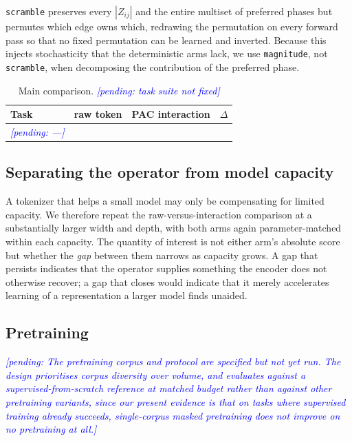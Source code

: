 \documentclass{article}
\newcommand{\pending}[1]{\textcolor{blue}{\textit{[pending: #1]}}}
\begin{document}
\texttt{scramble} preserves every $|Z_{ij}|$ and the entire multiset of preferred
phases but permutes which edge owns which, redrawing the permutation on every
forward pass so that no fixed permutation can be learned and inverted. Because
this injects stochasticity that the deterministic arms lack, we use
\texttt{magnitude}, not \texttt{scramble}, when decomposing the contribution of
the preferred phase.

\begin{table}[t]
\caption{Main comparison. \pending{task suite not fixed}}
\label{tab:main}
\begin{center}
\begin{tabular}{lccc}
\toprule
Task & raw token & PAC interaction & $\Delta$ \\
\midrule
\pending{---} & & & \\
\bottomrule
\end{tabular}
\end{center}
\end{table}

\subsection{Separating the operator from model capacity}
\label{sec:capacity}

A tokenizer that helps a small model may only be compensating for limited
capacity. We therefore repeat the raw-versus-interaction comparison at a
substantially larger width and depth, with both arms again parameter-matched
within each capacity. The quantity of interest is not either arm's absolute
score but whether the \emph{gap} between them narrows as capacity grows. A gap
that persists indicates that the operator supplies something the encoder does
not otherwise recover; a gap that closes would indicate that it merely
accelerates learning of a representation a larger model finds unaided.

\subsection{Pretraining}

\pending{The pretraining corpus and protocol are specified but not yet run. The
design prioritises corpus diversity over volume, and evaluates against a
supervised-from-scratch reference at matched budget rather than against other
pretraining variants, since our present evidence is that on tasks where
supervised training already succeeds, single-corpus masked pretraining does not
improve on no pretraining at all.}
\end{document}
